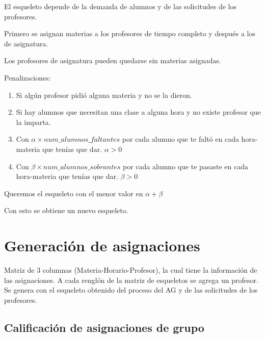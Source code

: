 El esqueleto depende de la demanda de alumnos y de las solicitudes de los profesores.

Primero se asignan materias a los profesores de tiempo completo y después a los de asignatura.

Los profesores de asignatura pueden quedarse sin materias asignadas.

Penalizaciones:

\begin{enumerate}
\item Si algún profesor pidió alguna materia y no se la dieron.

\item Si hay alumnos que necesitan una clase a alguna hora y no existe profesor que la imparta.

\item Con $\alpha \times num\_alumnos\_faltantes$ por cada alumno que te faltó en cada hora-materia que tenías que dar. $\alpha > 0$

\item Con $\beta \times num\_alumnos\_sobrantes$ por cada alumno que te pasaste en cada hora-materia que tenías que dar. $\beta > 0$

\end{enumerate}

Queremos el esqueleto con el menor valor en $\alpha + \beta$

Con esto se obtiene un nuevo esqueleto.


\section{Generación de asignaciones}

Matriz de 3 columnas (Materia-Horario-Profesor), la cual tiene la información de las asignaciones. A cada renglón de la matriz de esqueletos se agrega un profesor. Se genera con el esqueleto obtenido del proceso del AG y de las solicitudes de los profesores.

\subsection{Calificación de asignaciones de grupo}


%
%
%
%






